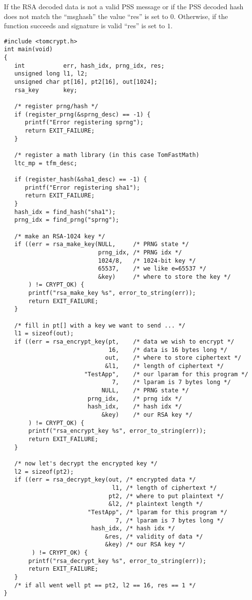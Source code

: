 \documentclass[a4paper]{book}
\begin{document}
If the RSA decoded data is not a valid PSS message or if the PSS decoded hash does not match the ``msghash'' 
the value ``res'' is set to $0$.  Otherwise, if the function succeeds and signature is valid ``res'' is set
to $1$.

\begin{verbatim}
#include <tomcrypt.h>
int main(void)
{
   int           err, hash_idx, prng_idx, res;
   unsigned long l1, l2;
   unsigned char pt[16], pt2[16], out[1024];
   rsa_key       key;

   /* register prng/hash */
   if (register_prng(&sprng_desc) == -1) {
      printf("Error registering sprng");
      return EXIT_FAILURE;
   }

   /* register a math library (in this case TomFastMath)
   ltc_mp = tfm_desc;

   if (register_hash(&sha1_desc) == -1) {
      printf("Error registering sha1");
      return EXIT_FAILURE;
   }
   hash_idx = find_hash("sha1");
   prng_idx = find_prng("sprng");

   /* make an RSA-1024 key */
   if ((err = rsa_make_key(NULL,     /* PRNG state */
                           prng_idx, /* PRNG idx */
                           1024/8,   /* 1024-bit key */
                           65537,    /* we like e=65537 */
                           &key)     /* where to store the key */
       ) != CRYPT_OK) {
       printf("rsa_make_key %s", error_to_string(err));
       return EXIT_FAILURE;
   }

   /* fill in pt[] with a key we want to send ... */
   l1 = sizeof(out);
   if ((err = rsa_encrypt_key(pt,    /* data we wish to encrypt */
                              16,    /* data is 16 bytes long */
                             out,    /* where to store ciphertext */
                             &l1,    /* length of ciphertext */
                       "TestApp",    /* our lparam for this program */
                               7,    /* lparam is 7 bytes long */
                            NULL,    /* PRNG state */
                        prng_idx,    /* prng idx */
                        hash_idx,    /* hash idx */
                            &key)    /* our RSA key */
       ) != CRYPT_OK) {
       printf("rsa_encrypt_key %s", error_to_string(err));
       return EXIT_FAILURE;
   }

   /* now let's decrypt the encrypted key */
   l2 = sizeof(pt2);
   if ((err = rsa_decrypt_key(out, /* encrypted data */
                               l1, /* length of ciphertext */
                              pt2, /* where to put plaintext */
                              &l2, /* plaintext length */
                        "TestApp", /* lparam for this program */
                                7, /* lparam is 7 bytes long */
                         hash_idx, /* hash idx */
                             &res, /* validity of data */
                             &key) /* our RSA key */ 
        ) != CRYPT_OK) {
       printf("rsa_decrypt_key %s", error_to_string(err));
       return EXIT_FAILURE;
   }
   /* if all went well pt == pt2, l2 == 16, res == 1 */
}
\end{verbatim}
\end{document}
